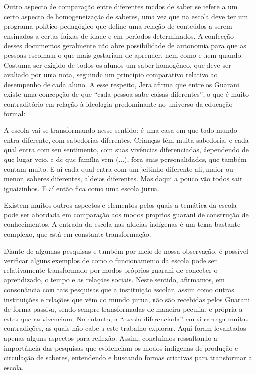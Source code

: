 \documentclass{article}
\begin{document}
Outro aspecto de compara\c{c}\~ao entre diferentes modos de saber se
refere a um certo aspecto de homogeneiza\c{c}\~ao de saberes, uma vez
que na escola deve ter um programa pol\'itico pedag\'ogico que define
uma rela\c{c}\~ao de conte\'udos a serem ensinados a certas faixas de
idade e em per\'iodos determinados. A confec\c{c}\~ao desses documentos
geralmente n\~ao abre possibilidade de autonomia para que as pessoas
escolham o que mais gostariam de aprender, nem como e nem quando.
Costuma ser exigido de todos os alunos um saber homog\^eneo, que deve
ser avaliado por uma nota, seguindo um princ\'ipio comparativo relativo
ao desempenho de cada aluno. A esse respeito, Jera afirma que entre os
Guarani existe uma concep\c{c}\~ao de que {\textquotedblleft}cada
pessoa sabe coisas diferentes{\textquotedblright}, o que \'e muito
contradit\'orio em rela\c{c}\~ao \`a ideologia predominante no universo
da educa\c{c}\~ao formal: 

A escola vai se transformando nesse sentido: \'e uma casa em que todo
mundo entra diferente, com sabedorias diferentes. Crian\c{c}as t\^em
muita sabedoria, e cada qual entra com seu sentimento, com suas
viv\^encias diferenciadas, dependendo de que lugar veio, e de que
fam\'ilia vem (...), fora suas personalidades, que tamb\'em contam
muito. E a\'i cada qual entra com um jeitinho diferente ali, maior ou
menor, saberes diferentes, aldeias diferentes. Mas daqui a pouco v\~ao
todos sair iguaizinhos. E a\'i ent\~ao fica como uma escola jurua.

Existem muitos outros aspectos e elementos pelos quais a tem\'atica da
escola pode ser abordada em compara\c{c}\~ao aos modos pr\'oprios
guarani de constru\c{c}\~ao de conhecimentos. A entrada da escola nas
aldeias ind\'igenas \'e um tema bastante complexo, que est\'a em
constante transforma\c{c}\~ao.

Diante de algumas pesquisas e tamb\'em por meio de nossa
observa\c{c}\~ao, \'e poss\'ivel verificar alguns exemplos de como o
funcionamento da escola pode ser relativamente transformado por modos
pr\'oprios guarani de conceber o aprendizado, o tempo e as
rela\c{c}\~oes sociais. Neste sentido, afirmamos, em conson\^ancia com
tais pesquisas que a institui\c{c}\~ao escolar, assim como outras
institui\c{c}\~oes e rela\c{c}\~oes que v\^em do mundo jurua, n\~ao
s\~ao recebidas pelos Guarani de forma passiva, sendo sempre
transformadas de maneira peculiar e pr\'opria a estes que as vivenciam.
No entanto, a {\textquotedblleft}escola
diferenciada{\textquotedblright} em si carrega muitas
contradi\c{c}\~oes, as quais n\~ao cabe a este trabalho explorar. Aqui
foram levantados apenas alguns aspectos para reflex\~ao. Assim,
conclu\'imos ressaltando a import\^ancia das pesquisas que evidenciam
os modos ind\'igenas de produ\c{c}\~ao e circula\c{c}\~ao de saberes,
entendendo e buscando formas criativas para transformar a escola.
\end{document}
